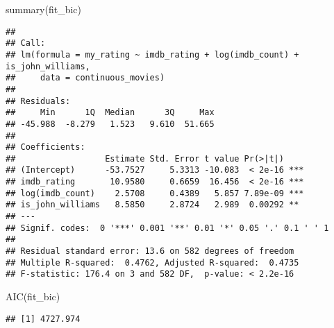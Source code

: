 \documentclass[
]{article}
\newenvironment{Shaded}{\begin{snugshade}}{\end{snugshade}}
\newcommand{\AttributeTok}[1]{\textcolor[rgb]{0.77,0.63,0.00}{#1}}
\newcommand{\DecValTok}[1]{\textcolor[rgb]{0.00,0.00,0.81}{#1}}
\newcommand{\FunctionTok}[1]{\textcolor[rgb]{0.00,0.00,0.00}{#1}}
\newcommand{\NormalTok}[1]{#1}
\newcommand{\SpecialCharTok}[1]{\textcolor[rgb]{0.00,0.00,0.00}{#1}}
\newcommand{\StringTok}[1]{\textcolor[rgb]{0.31,0.60,0.02}{#1}}
\begin{document}
\begin{Shaded}
\begin{Highlighting}[]
\FunctionTok{summary}\NormalTok{(fit\_bic)}
\end{Highlighting}
\end{Shaded}

\begin{verbatim}
## 
## Call:
## lm(formula = my_rating ~ imdb_rating + log(imdb_count) + is_john_williams, 
##     data = continuous_movies)
## 
## Residuals:
##     Min      1Q  Median      3Q     Max 
## -45.988  -8.279   1.523   9.610  51.665 
## 
## Coefficients:
##                  Estimate Std. Error t value Pr(>|t|)    
## (Intercept)      -53.7527     5.3313 -10.083  < 2e-16 ***
## imdb_rating       10.9580     0.6659  16.456  < 2e-16 ***
## log(imdb_count)    2.5708     0.4389   5.857 7.89e-09 ***
## is_john_williams   8.5850     2.8724   2.989  0.00292 ** 
## ---
## Signif. codes:  0 '***' 0.001 '**' 0.01 '*' 0.05 '.' 0.1 ' ' 1
## 
## Residual standard error: 13.6 on 582 degrees of freedom
## Multiple R-squared:  0.4762, Adjusted R-squared:  0.4735 
## F-statistic: 176.4 on 3 and 582 DF,  p-value: < 2.2e-16
\end{verbatim}

\begin{Shaded}
\begin{Highlighting}[]
\FunctionTok{AIC}\NormalTok{(fit\_bic)}
\end{Highlighting}
\end{Shaded}

\begin{verbatim}
## [1] 4727.974
\end{verbatim}

\begin{Shaded}
\end{Shaded}
\end{document}
